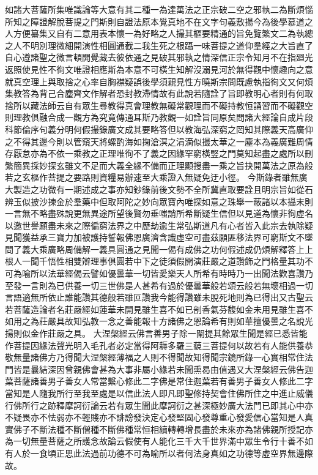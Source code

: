 如諸大菩薩所集唯識論等大意有其二種一為達萬法之正宗破二空之邪執二為斷煩惱所知之障證解脫菩提之門斯則自證法原本覺真地不在文字句義敷揚今為後學慕道之人方便纂集又自有二意用表本懷一為好略之人撮其樞要精通的旨免覽繁文二為執總之人不明別理微細開演性相圓通截二我生死之根躡一味菩提之道仰羣經之大旨直了自心遵諸聖之微言頓開覺藏去彼依通之見破其邪執之情深信正宗令知月不在指廻光返照使見性不徇文唯證相應斯為本意不可橫生知解沒溺見河於無得觀中懷趣向之意就真空理上與取捨之心率自胸襟疑誤後學須親見性方曉斯宗問既慮執指徇文又何煩集教答為背己合塵齊文作解者恐封教滯情故有此說若隨詮了旨即教明心者則有何取捨所以藏法師云自有眾生尋教得真會理教無礙常觀理而不礙持教恒誦習而不礙觀空則理教俱融合成一觀方為究竟傳通耳斯乃教觀一如詮旨同原矣問諸大經論自成片段科節倫序句義分明何假撮錄廣文成其要略答但以教海弘深窮之罔知其際義天高廣仰之不得其邊今則以管窺天將螺酌海如掬滄溟之涓滴似撮太華之一塵本為義廣難周情存厭怠亦為不依一乘教之正理唯徇不了義之因緣罕窮橫竪之門莫知起盡之處所以刪繁簡異採妙探玄雖文不足而大義全緣不備而正理顯搜盡一乘之旨抉開萬法之原為般若之玄樞作菩提之要路則資糧易辦速至大乘證入無疑免迂小徑。
今斯錄者雖無廣大製造之功微有一期述成之事亦知鈔錄前後文勢不全所冀直取要詮且明宗旨如從石辨玉似披沙揀金於羣藥中但取阿陀之妙向眾寶內唯探如意之珠舉一蔽諸以本攝末則一言無不略盡殊說更無異途所望後賢勿垂嗤誚所希斷疑生信但以見道為懷非徇虛名以邀世譽願盡未來之際徧窮法界之中歷劫逾生常弘斯道凡有心者皆入此宗去執除疑見聞獲益承三寶力加被護持誓報佛恩廣濟含識虛空可盡茲願匪移法界可窮斯文不墜問了義大乘廣略周備解一義具圓通之見聞一偈有成佛之功何假述成仍煩解釋答上上根人一聞千悟性相雙辯理事俱圓若中下之徒須假開演莊嚴之道讚飾之門格量其功不可為喻所以法華經偈云譬如優曇華一切皆愛樂天人所希有時時乃一出聞法歡喜讚乃至發一言則為已供養一切三世佛是人甚希有過於優曇華般若頌云般若無壞相過一切言語適無所依止誰能讚其德般若雖叵讚我今能得讚雖未脫死地則為已得出又古聖云若菩薩造論者名莊嚴經如蓮華未開見雖生喜不如已剖香氣芬馥如金未用見雖生喜不如用之為莊嚴具故知弘教一念之善能報十方諸佛之恩論希有則如華擅優曇之名說光揚則似金作莊嚴之具。
大涅槃經云佛言善男子除一闡提其餘眾生聞是經已悉皆能作菩提因緣法聲光明入毛孔者必定當得阿耨多羅三藐三菩提何以故若有人能供養恭敬無量諸佛方乃得聞大涅槃經薄福之人則不得聞故知得聞宗鏡所錄一心實相常住法門皆是曩結深因曾親佛會甚為大事非屬小緣若未聞熏曷由值遇又大涅槃經云佛告迦葉菩薩諸善男子善女人常當繫心修此二字佛是常住迦葉若有善男子善女人修此二字當知是人隨我所行至我至處是以信此法人即凡即聖修持契會住佛所住之中進止威儀行佛所行之跡釋摩訶衍論云若有眾生聞此摩訶衍之甚深極妙廣大法門已即其心中亦不疑畏亦不怯弱亦不輕賤亦不誹謗發決定心發堅固心發尊重心發愛信心當知是人真實佛子不斷法種不斷僧種不斷佛種常恒相續轉轉增長盡於未來亦為諸佛親所授記亦為一切無量菩薩之所護念故論云假使有人能化三千大千世界滿中眾生令行十善不如有人於一食頃正思此法過前功德不可為喻所以者何法身真如之功德等虛空界無邊際故。
